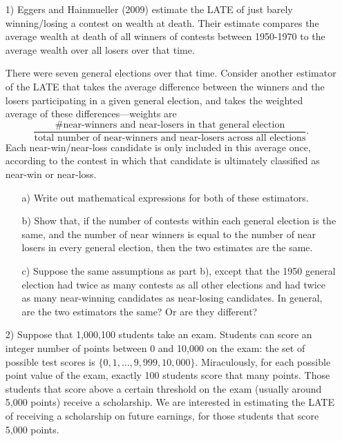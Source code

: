 \documentclass{article}
\begin{document}
\begin{itemize}
  \item[1)]
    Eggers and Hainmueller (2009) estimate the 
    LATE of just barely winning/losing a contest on wealth at death. 
    Their estimate compares the average wealth at death of
    all winners of contests between 1950-1970
    to the average wealth over all losers over that time.
   
   There were seven general elections over that time.  
   Consider another estimator of the LATE that takes the average difference 
   between the winners and the losers participating in a given general election, 
   and takes the weighted average of these differences---weights are
   $$
     \frac{\#\text{near-winners and near-losers in that general election}}
      {\text{total number of near-winners and near-losers across all elections}}.
   $$
   Each near-win/near-loss candidate is only included in this average once, according
   to the contest in which that candidate is ultimately classified as near-win or near-loss.
   
   \begin{itemize}
     \item[a)]  Write out mathematical expressions for both of these estimators.
     \item[b)]
       Show that, if the number of contests within each general election is the same, 
       and the number of near winners is equal to the 
       number of near losers in every general election, then
       the two estimates are the same.
     \item[c)]  Suppose the same assumptions as part b), 
       except that the 1950 general election 
       had twice as many contests as all other elections
       and had twice as many near-winning candidates as near-losing candidates.       
       In general, are the two estimators the same?  Or are they different?
   \end{itemize}   
\item[2)]
   Suppose that 1,000,100 students take an exam.
   Students can score an integer number of points between 0 and 10,000 
   on the exam:
   the set of possible test scores is $\{0, 1, \ldots, 9,999, 10,000\}$.
   Miraculously, for each possible point value of the exam, 
   exactly 100 students score that many points.    
   Those students that score above a certain threshold on the exam
   (usually around 5,000 points) receive 
   a scholarship.
   We are interested in estimating the LATE of receiving a scholarship
   on future earnings, for those students that score 5,000 points.
   

\end{itemize}
\end{document}
